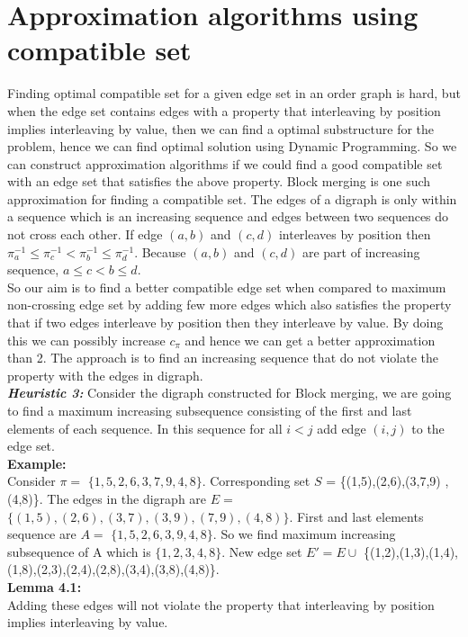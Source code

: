\documentclass[BTech]{iitmdiss}
\begin{document}
\section{Approximation algorithms using compatible set}
Finding optimal compatible set for a given edge set in an order graph is hard, but when the edge set contains edges with a property that interleaving by position implies interleaving by value, then we can find a optimal substructure for the problem, hence we can find optimal solution using Dynamic Programming. So we can construct approximation algorithms if we could find a good compatible set with an edge set that satisfies the above property. Block merging is one such approximation for finding a compatible set. The edges of a digraph is only within a sequence which is an increasing sequence and edges between two sequences do not cross each other. If edge $(a,b)$ and $(c,d)$ interleaves by position then $\pi^{-1}_a \leq \pi^{-1}_c < \pi^{-1}_b\leq \pi^{-1}_d$. Because $(a,b)$ and $(c,d)$ are part of increasing sequence, $a \leq c < b\leq d$.\\
 So our aim is to find a better compatible edge set when compared to maximum non-crossing edge set by adding few more edges which also satisfies the property that if two edges interleave by position then they interleave by value. By doing this we can possibly increase $c_\pi$ and hence we can get a better approximation than 2. The approach is to find an increasing sequence that do not violate the property with the edges in digraph.\\
\textit{\textbf{Heuristic 3:}} Consider the digraph constructed for Block merging, we are going to find a maximum increasing subsequence consisting of the first and last elements of each sequence. In this sequence for all $i<j$ add edge $(i,j)$ to the edge set.\\
\textbf{Example:}\\
Consider $\pi = $ $\{1,5,2,6,3,7,9,4,8\}$. Corresponding set $S$ = \{(1,5),(2,6),(3,7,9) ,(4,8)\}. The edges in the digraph are $E =$ $\{(1,5),(2,6),(3,7),(3,9),(7,9),(4,8)\}$. First and last elements sequence are $A = $ $\{1,5,2,6,3,9,4,8\}$. So we find maximum increasing subsequence of A which is $\{1,2,3,4,8\}$. New edge set $E' = E \cup$ \{(1,2),(1,3),(1,4),(1,8),(2,3),(2,4),(2,8),(3,4),(3,8),(4,8)\}.\\
\textbf{Lemma 4.1:}\\ Adding these edges will not violate the property that interleaving by position implies interleaving by value.\\
\end{document}
